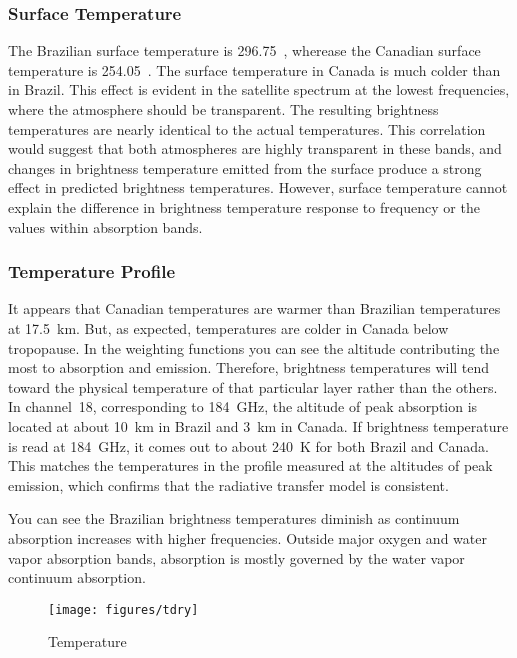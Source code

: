 \documentclass[twocol]{ametsoc}
\begin{document}
\subsubsection{Surface Temperature}

The Brazilian surface temperature is 296.75~, wherease the Canadian surface temperature is 254.05~.
The surface temperature in Canada is much colder than in Brazil.
This effect is evident in the satellite spectrum at the lowest frequencies, where the atmosphere should be transparent.
The resulting brightness temperatures are nearly identical to the actual temperatures.
This correlation would suggest that both atmospheres are highly transparent in these bands, and changes in brightness temperature emitted from the surface produce a strong effect in predicted brightness temperatures.
However, surface temperature cannot explain the difference in brightness temperature response to frequency or the values within absorption bands.

\subsubsection{Temperature Profile}

It appears that Canadian temperatures are warmer than Brazilian temperatures at 17.5~km.
But, as expected, temperatures are colder in Canada below tropopause.
In the weighting functions you can see the altitude contributing the most to absorption and emission. Therefore, brightness temperatures will tend toward the physical temperature of that particular layer rather than the others.
In channel~18, corresponding to 184~GHz, the altitude of peak absorption is located at about 10~km in Brazil and 3~km in Canada.
If brightness temperature is read at 184~GHz, it comes out to about 240~K for both Brazil and Canada.
This matches the temperatures in the profile measured at the altitudes of peak emission, which confirms that the radiative transfer model is consistent.

You can see the Brazilian brightness temperatures diminish as continuum absorption increases with higher frequencies.
Outside major oxygen and water vapor absorption bands, absorption is mostly governed by the water vapor continuum absorption.


\begin{figure}
	\centering
	\texttt{[image: figures/tdry]}
	\caption{Temperature}
	\label{fig:tdry}
\end{figure}
\end{document}

